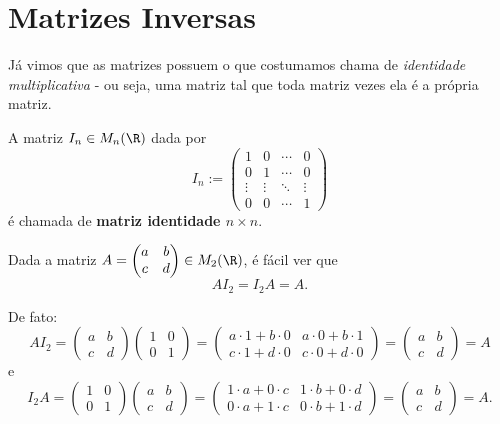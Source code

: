 \section{Matrizes Inversas}

Já vimos que as matrizes possuem o que costumamos chama de \textit{identidade multiplicativa} - ou seja, uma matriz tal que toda matriz vezes ela é a própria matriz.

\begin{df}
	A matriz $I_n\in M_n(\R)$ dada por
	\[I_n:=\begin{pmatrix}
	1&0&\cdots&0\\0&1&\cdots&0\\\vdots&\vdots&\ddots&\vdots\\0&0&\cdots&1
	\end{pmatrix}\] é chamada de \textbf{matriz identidade $n\times n$}.
\end{df}

\begin{ex}
	Dada a matriz $A=\begin{pmatrix}
	a&b\\c&d
	\end{pmatrix}\in M_2(\R)$, é fácil ver que
	\[AI_2=I_2A=A.\]
	
	De fato:
	\[AI_2=\begin{pmatrix}
	a&b\\c&d
	\end{pmatrix}\begin{pmatrix}
	1&0\\0&1
	\end{pmatrix}=\begin{pmatrix}
	a\cdot1+b\cdot 0&a\cdot0+b\cdot 1\\c\cdot1+d\cdot0&c\cdot0+d\cdot0
	\end{pmatrix}=\begin{pmatrix}
	a&b\\c&d
	\end{pmatrix}=A\]e
	\[I_2A=\begin{pmatrix}
	1&0\\0&1
	\end{pmatrix}\begin{pmatrix}
	a&b\\c&d
	\end{pmatrix}=\begin{pmatrix}
	1\cdot a+0\cdot c&1\cdot b+0\cdot d\\0\cdot a+ 1\cdot c&0\cdot b+1\cdot d
	\end{pmatrix}=\begin{pmatrix}
	a&b\\c&d
	\end{pmatrix}=A.\]
\end{ex}

